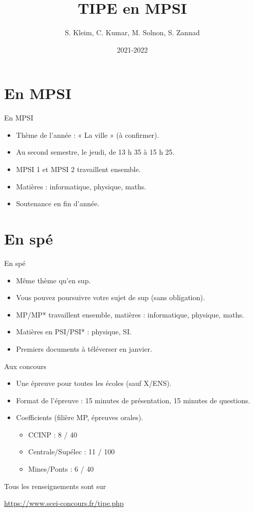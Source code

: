 \documentclass{beamer}
\title{TIPE en MPSI}
\author{S. Kleim, C. Kumar, M. Solnon, S. Zannad}
\institute{Lycée La Martinière Monplaisir, Lyon}
\date{2021-2022}
\begin{document}
\begin{frame}
\titlepage
\end{frame}
\section{En MPSI}
\begin{frame}{En MPSI}
\begin{itemize}
\item Thème de l'année : « La ville » (à confirmer). 
\item Au second semestre, le jeudi, de 13 h 35 à 15 h 25.
\item MPSI 1 et MPSI 2 travaillent ensemble. 
\item Matières : informatique, physique, maths. 
\item Soutenance en fin d'année. 
\end{itemize}

\end{frame}

\section{En spé}
\begin{frame}{En spé}
\begin{itemize}
\item Même thème qu'en sup. 
\item Vous pouvez poursuivre votre sujet de sup (sans obligation). 
\item MP/MP* travaillent ensemble, matières : informatique, physique, maths.
\item Matières en PSI/PSI* : physique, SI. 
\item Premiers documents à téléverser en janvier. 
\end{itemize}
\end{frame}

\begin{frame}{Aux concours}
    \begin{itemize}
        \item Une épreuve pour toutes les écoles (sauf X/ENS). 
        \item Format de l'épreuve : 15 minutes de présentation, 15 minutes de questions. 
        \item Coefficients (filière MP, épreuves orales). 
            \begin{itemize}
                \item CCINP : 8 / 40
                \item Centrale/Supélec : 11 / 100
                \item Mines/Ponts : 6 / 40
            \end{itemize}
    \end{itemize}
    Tous les renseignements sont sur 
    \begin{center}
        \url{https://www.scei-concours.fr/tipe.php}
    \end{center}
\end{frame}
\end{document}
